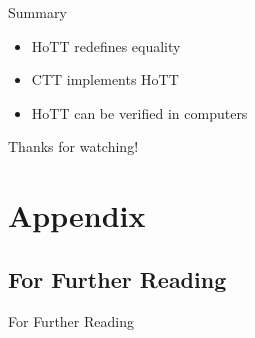 \documentclass[english,draft]{beamer}
\begin{document}
\begin{frame}{Summary}

    \begin{itemize}
        \item HoTT redefines equality
        \item CTT implements HoTT
        \item HoTT can be verified in computers 
    \end{itemize}

Thanks for watching!

\end{frame}

\appendix

\section*{Appendix}

\subsection*{For Further Reading}
\begin{frame}[allowframebreaks]{For Further Reading}



\end{frame}
\end{document}
